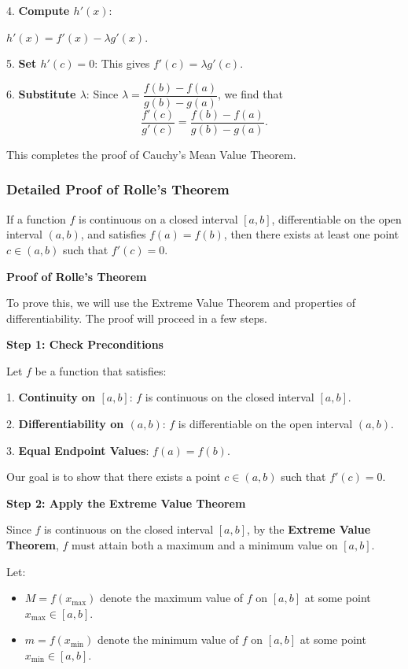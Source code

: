 \documentclass[a4paper,12pt]{book}
\begin{document}
4. \textbf{Compute \( h'(x) \)}:

\( h'(x) = f'(x) - \lambda g'(x) \).

5. \textbf{Set \( h'(c) = 0 \)}: This gives \( f'(c) = \lambda g'(c) \).

6. \textbf{Substitute \( \lambda \)}: Since \( \lambda = \dfrac{f(b) - f(a)}{g(b) - g(a)} \), we find that
\[
\dfrac{f'(c)}{g'(c)} = \dfrac{f(b) - f(a)}{g(b) - g(a)}.
\]

This completes the proof of Cauchy’s Mean Value Theorem.

\subsubsection{Detailed Proof of Rolle's Theorem}

\begin{light_gray_box}
If a function \( f \) is continuous on a closed interval \([a, b]\), differentiable on the open interval \((a, b)\), and satisfies \( f(a) = f(b) \), then there exists at least one point \( c \in (a, b) \) such that \( f'(c) = 0 \).
\end{light_gray_box}

\textbf{Proof of Rolle's Theorem}

To prove this, we will use the Extreme Value Theorem and properties of differentiability. The proof will proceed in a few steps.

\textbf{Step 1: Check Preconditions}

Let \( f \) be a function that satisfies:

1. \textbf{Continuity on \([a, b]\)}: \( f \) is continuous on the closed interval \([a, b]\).

2. \textbf{Differentiability on \((a, b)\)}: \( f \) is differentiable on the open interval \((a, b)\).

3. \textbf{Equal Endpoint Values}: \( f(a) = f(b) \).

Our goal is to show that there exists a point \( c \in (a, b) \) such that \( f'(c) = 0 \).

\textbf{Step 2: Apply the Extreme Value Theorem}

Since \( f \) is continuous on the closed interval \([a, b]\), by the \textbf{Extreme Value Theorem}, \( f \) must attain both a maximum and a minimum value on \([a, b]\). 

Let:

\begin{itemize}
	\item 
	\( M = f(x_{\text{max}}) \) denote the maximum value of \( f \) on \([a, b]\) at some point \( x_{\text{max}} \in [a, b] \).
	\item 
	\( m = f(x_{\text{min}}) \) denote the minimum value of \( f \) on \([a, b]\) at some point \( x_{\text{min}} \in [a, b] \).
\end{itemize}
\end{document}
